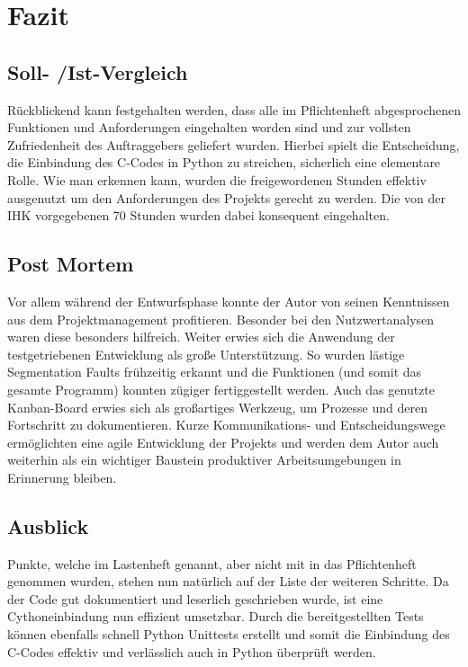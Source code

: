 \section{Fazit}
\label{section:postmortem}
\subsection{Soll- /Ist-Vergleich}
Rückblickend kann festgehalten werden, dass alle im Pflichtenheft
abgesprochenen Funktionen und Anforderungen eingehalten worden sind
und zur vollsten Zufriedenheit des Auftraggebers geliefert wurden. Hierbei
spielt die Entscheidung, die Einbindung des C-Codes in Python zu streichen, sicherlich
eine elementare Rolle. Wie man erkennen kann, wurden die freigewordenen Stunden effektiv ausgenutzt um den Anforderungen des Projekts gerecht zu werden. Die von der IHK vorgegebenen 70 Stunden wurden dabei konsequent eingehalten.

\subsection{Post Mortem}

Vor allem während der Entwurfsphase konnte der Autor von seinen Kenntnissen aus dem Projektmanagement profitieren. Besonder bei den Nutzwertanalysen waren diese besonders hilfreich. Weiter erwies sich die Anwendung der
testgetriebenen Entwicklung als große Unterstützung. So wurden lästige Segmentation Faults frühzeitig erkannt und die Funktionen (und somit das gesamte Programm) konnten zügiger fertiggestellt werden.
Auch das genutzte Kanban-Board erwies sich als großartiges Werkzeug, um Prozesse und deren Fortschritt zu dokumentieren.
Kurze Kommunikations- und Entscheidungswege ermöglichten eine agile Entwicklung der Projekts und werden
dem Autor auch weiterhin als ein wichtiger Baustein produktiver Arbeitsumgebungen in Erinnerung bleiben.

\subsection{Ausblick}
Punkte, welche im Lastenheft genannt, aber nicht mit in das Pflichtenheft genommen wurden,
stehen nun natürlich auf der Liste der weiteren Schritte. Da der Code gut dokumentiert
und leserlich geschrieben wurde, ist eine Cythoneinbindung nun effizient umsetzbar.
Durch die bereitgestellten Tests können ebenfalls schnell Python Unittests erstellt und somit
die Einbindung des C-Codes effektiv und verlässlich auch in Python überprüft werden.

